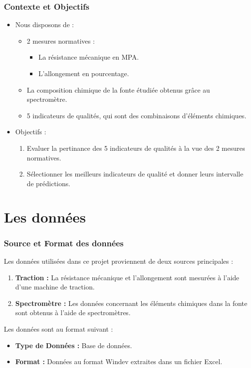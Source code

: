 \documentclass[aspectratio=169]{beamer}
\begin{document}
\begin{frame}
\frametitle{Contexte et Objectifs}
    \begin{itemize}
      \item Nous disposons de :
        \begin{itemize}
            \item 2 mesures normatives  :
              \begin{itemize}
                  \item La résistance mécanique en MPA.
                  \item L'allongement en pourcentage.
              \end{itemize}
            \item La composition chimique de la fonte étudiée obtenus grâce au spectromètre.
            \item 5 indicateurs de qualités, qui sont des combinaisons d'éléments chimiques.
        \end{itemize}
      \item Objectifs :
        \begin{enumerate}
            \item Evaluer la pertinance  des 5 indicateurs de qualités à la vue des 2 mesures normatives.
            \item Sélectionner  les meilleurs indicateurs de qualité et donner leurs intervalle de prédictions.
            
        \end{enumerate}
    \end{itemize}
\end{frame}


\section{Les données}



\begin{frame}
\frametitle{Source et Format des données}
Les données utilisées dans ce projet proviennent de deux sources principales :

\begin{enumerate}
    \item \textbf{Traction :} La résistance mécanique et l'allongement sont mesurées à l'aide d'une machine de traction.
    \item \textbf{Spectromètre :} Les données concernant les éléments chimiques dans la fonte sont obtenus à l'aide de spectromètres.
\end{enumerate}

Les données sont au format suivant :

\begin{itemize}
\item \textbf{Type de Données :} Base de données.
\item \textbf{Format :} Données au format Windev extraites dans un fichier Excel.
\end{itemize}

\end{frame}
\end{document}
